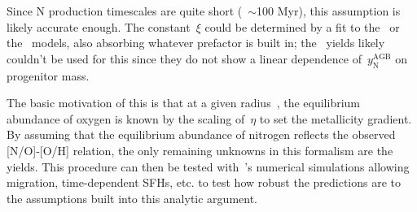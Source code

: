 \documentclass[\main/notes.tex]{subfiles}
\begin{document}
Since N production timescales are quite short (~$\sim$100 Myr), this assumption 
is likely accurate enough. 
The constant~$\xi$ could be determined by a fit to the~\citet{Cristallo2011} or 
the~\citet{Ventura2013} models, also absorbing whatever prefactor is built in; 
the~\citet{Karakas2010} yields likely couldn't be used for this since they do 
not show a linear dependence of~$y_\text{N}^\text{AGB}$ on progenitor mass. 
\par 
The basic motivation of this is that at a given radius~\rgal, the equilibrium 
abundance of oxygen is known by the scaling of~$\eta$ to set the metallicity 
gradient. 
By assuming that the equilibrium abundance of nitrogen reflects the observed 
[N/O]-[O/H] relation, the only remaining unknowns in this formalism are the 
yields. 
This procedure can then be tested with~\vice's numerical simulations allowing 
migration, time-dependent SFHs, etc. to test how robust the predictions are to 
the assumptions built into this analytic argument. 




%   
%  
\biblio 
\end{document}
